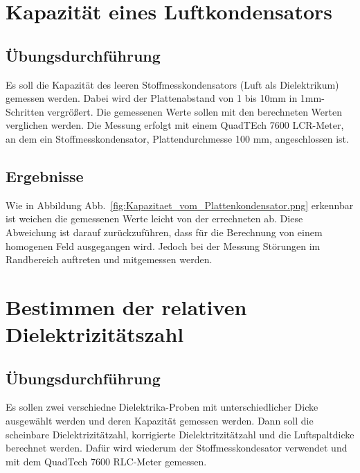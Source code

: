 \documentclass[a4paper,twoside,12pt,DIV=13,BCOR=5mm,numbers=noenddot,cleardoublepage=empty]{scrbook}
\begin{document}
    \section{Kapazit\"at eines Luftkondensators}
    \subsection{\"Ubungsdurchf\"uhrung}
    Es soll die Kapazit\"at des leeren Stoffmesskondensators (Luft als Dielektrikum) gemessen werden. Dabei wird der Plattenabstand von 1 bis 10mm in 1mm-Schritten vergr\"o\ss{}ert. Die gemessenen Werte sollen mit den berechneten Werten verglichen werden.
    Die Messung erfolgt mit einem QuadTEch 7600 LCR-Meter, an dem ein Stoffmesskondensator, Plattendurchmesse 100 mm, angeschlossen ist.
    \subsection{Ergebnisse}
    Wie in Abbildung Abb.~\ref{fig:Kapazitaet_vom_Plattenkondensator.png} erkennbar ist weichen die gemessenen Werte leicht von der errechneten ab. Diese Abweichung ist darauf zur\"uckzuf\"uhren, dass f\"ur die Berechnung von einem homogenen Feld ausgegangen wird. Jedoch bei der Messung St\"orungen im Randbereich auftreten und mitgemessen werden.
    \section{Bestimmen der relativen Dielektrizit\"atszahl}
    \subsection{\"Ubungsdurchf\"uhrung}
    Es sollen zwei verschiedne Dielektrika-Proben mit unterschiedlicher Dicke ausgew\"ahlt werden und deren Kapazit\"at gemessen werden. Dann soll die scheinbare Dielektrizit\"atzahl, korrigierte Dielektritzit\"atzahl und die Luftspaltdicke berechnet werden.
    Daf\"ur wird wiederum der Stoffmesskondesator verwendet und mit dem QuadTech 7600 RLC-Meter gemessen.
\end{document}
